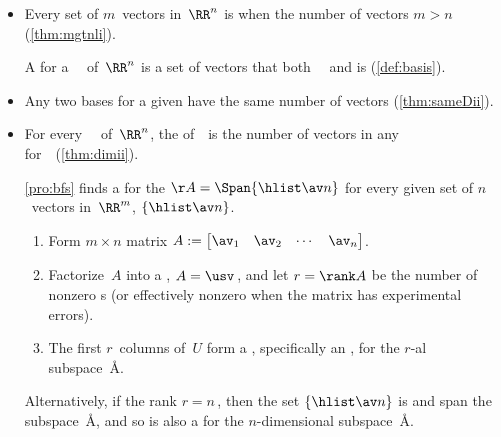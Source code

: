 \begin{itemize}
\itemhi For every \(n\times n\) matrix~\(A\), let \hlist\lambda m\ be distinct s of~\(A\) with corresponding s \hlist\vv m.
Then the set \(\{\hlist \vv m\}\) is  (\autoref{thm:indepev}).

\itemme Let \hlist\vv m\ be vectors in~\(\RR^n\),
and let the \(n\times m\) matrix \(V=\begin{bmatrix} \vv_1&\vv_2&\cdots&\vv_m \end{bmatrix}\).  
Then the set \(\{\hlist\vv m\}\) is  if and only if the  system \(V\cv=\ov\) has a nonzero solution~\cv\ (\autoref{thm:linhomo}).

\item Every  set of \(m\)~vectors in~\(\RR^n\) is  when the number of vectors \(m>n\) (\autoref{thm:mgtnli}).

\itemme A  for a ~\WW\ of~\(\RR^n\) is a set of  vectors that both ~\WW\ and is  (\autoref{def:basis}).

\item Any two bases for a given  have the same number of vectors (\autoref{thm:sameDii}).

\item For every ~\WW\ of~\(\RR^n\),  
the  of~\WW\ is the number of vectors in any  for~\WW\ (\autoref{thm:dimii}). 

\itemme \autoref{pro:bfs} finds a  for the  \(\AA=\Span\{\hlist\av n\}\) for every given set of $n$~vectors in~\(\RR^m\), $\{\hlist\av n\}$.
\begin{enumerate}
\item Form \(m\times n\) matrix $A:= \begin{bmatrix} \av_1 & \av_2& \cdots&\av_n \end{bmatrix}$. 
\item Factorize~\(A\) into a \svd, $A=\usv$\,, and let \(r=\rank A\) be the number of nonzero s (or effectively nonzero when the matrix has experimental errors).
\item The first \(r\)~columns of~\(U\) form a , specifically an , for the \(r\)-al subspace~\AA.
\end{enumerate}
Alternatively, if the rank \(r=n\)\,, then the set \(\{\hlist\av n\}\) is  and span the subspace~\AA, and so is also a  for the \(n\)-dimensional subspace~\AA.



\end{itemize}
